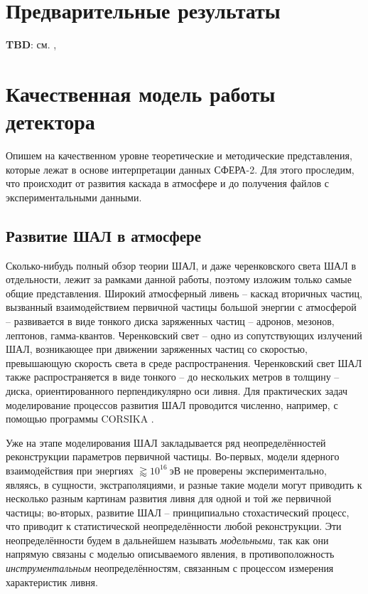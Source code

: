 \section{Предварительные результаты}

\textbf{TBD}: см. \cite{Antonov2013}, 

\section{Качественная модель работы детектора}
\label{sec:sphere-2-model}

Опишем на качественном уровне теоретические и методические представления, которые лежат в основе интерпретации данных СФЕРА-2. Для этого проследим, что происходит от развития каскада в атмосфере и до получения файлов с экспериментальными данными.

\subsection{Развитие ШАЛ в атмосфере}

Сколько-нибудь полный обзор теории ШАЛ, и даже черенковского света ШАЛ в отдельности, лежит за рамками данной работы, поэтому изложим только самые общие представления. Широкий атмосферный ливень -- каскад вторичных частиц, вызванный взаимодействием первичной частицы большой энергии с атмосферой -- развивается в виде тонкого диска заряженных частиц -- адронов, мезонов, лептонов, гамма-квантов. Черенковский свет -- одно из сопутствующих излучений ШАЛ, возникающее при движении заряженных частиц со скоростью, превышающую скорость света в среде распространения. Черенковский свет ШАЛ также распространяется в виде тонкого -- до нескольких метров в толщину -- диска, ориентированного перпендикулярно оси ливня. Для практических задач моделирование процессов развития ШАЛ проводится численно, например, с помощью программы CORSIKA \cite{CORSIKA-report}.

Уже на этапе моделирования ШАЛ закладывается ряд неопределённостей реконструкции параметров первичной частицы. Во-первых, модели ядерного взаимодействия при энергиях $\gtrapprox 10^{16}~\text{эВ}$ не проверены экспериментально, являясь, в сущности, экстраполяциями, и разные такие модели могут приводить к несколько разным картинам развития ливня для одной и той же первичной частицы; во-вторых, развитие ШАЛ -- принципиально стохастический процесс, что приводит к статистической неопределённости любой реконструкции. Эти неопределённости будем в дальнейшем называть \textit{модельными}, так как они напрямую связаны с моделью описываемого явления, в противоположность \textit{инструментальным} неопределённостям, связанным с процессом измерения характеристик ливня.

